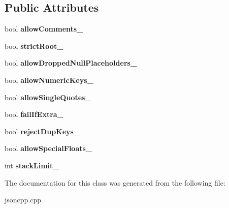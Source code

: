 \subsection*{Public Attributes}
\begin{DoxyCompactItemize}
\item 
\mbox{\label{classJson_1_1OurFeatures_ac71bb7ba7363d3b05ed76602b036ce33}} 
bool {\bfseries allow\+Comments\+\_\+}
\item 
\mbox{\label{classJson_1_1OurFeatures_a2095f66a776c0a4ae6cc931a0c94242e}} 
bool {\bfseries strict\+Root\+\_\+}
\item 
\mbox{\label{classJson_1_1OurFeatures_a13963bc44bf948eec1968f7ff8e8f5f1}} 
bool {\bfseries allow\+Dropped\+Null\+Placeholders\+\_\+}
\item 
\mbox{\label{classJson_1_1OurFeatures_af6973fc7e774ce2d634ba99442aeb91a}} 
bool {\bfseries allow\+Numeric\+Keys\+\_\+}
\item 
\mbox{\label{classJson_1_1OurFeatures_abbd6c196d7a22e2a360a59887eda4610}} 
bool {\bfseries allow\+Single\+Quotes\+\_\+}
\item 
\mbox{\label{classJson_1_1OurFeatures_ae8ad25b90706c78f1a8fe929191ac61b}} 
bool {\bfseries fail\+If\+Extra\+\_\+}
\item 
\mbox{\label{classJson_1_1OurFeatures_a39b8e0b86b1c24a45e800c023bb715aa}} 
bool {\bfseries reject\+Dup\+Keys\+\_\+}
\item 
\mbox{\label{classJson_1_1OurFeatures_af760f91cc2a7af37e44f78fb466061bb}} 
bool {\bfseries allow\+Special\+Floats\+\_\+}
\item 
\mbox{\label{classJson_1_1OurFeatures_a9a786713902d14be6d57a08cc03ccfff}} 
int {\bfseries stack\+Limit\+\_\+}
\end{DoxyCompactItemize}


The documentation for this class was generated from the following file\+:\begin{DoxyCompactItemize}
\item 
jsoncpp.\+cpp\end{DoxyCompactItemize}
